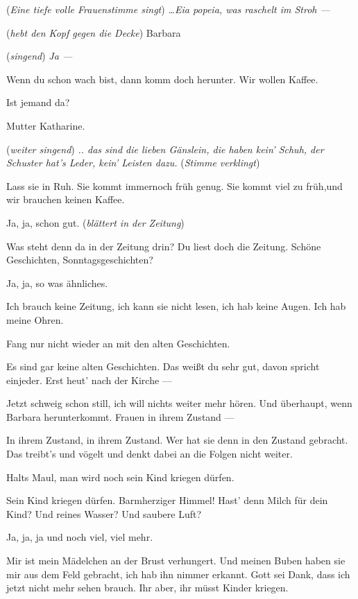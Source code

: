 \documentclass[
	final,
	a4paper,
	ngerman,
	mpinclude = true, %
	twoside = true,
	open = right,
	cleardoublepage = plain,
	DIV = 13,
	BCOR = 1cm,
	titlepage = firstiscover,
	]{scrbook}
\newcommand{\direction}[1]{(\textit{#1})}
\newcommand{\thecharacter}[1]{\textup{\textsc{#1}}\xspace}
\newcommand{\theBarbara}{\thecharacter{Barbara}}
\newcommand{\theJosef}{\thecharacter{Josef}}
\newcommand{\theKathrine}{\thecharacter{Kathrine}}
\newcommand{\character}[1]{\item[#1]}
\newcommand{\Barbara}{\character{\theBarbara}}
\newcommand{\Josef}{\character{\theJosef}}
\newcommand{\Kathrine}{\character{\theKathrine}}
\begin{document}
\begin{play}

\Barbara
\direction{Eine tiefe volle Frauenstimme singt} \emph{\ldots Eia popeia, was raschelt im Stroh ---}

\Josef
\direction{hebt den Kopf gegen die Decke} Barbara

\Barbara
\direction{singend} \emph{Ja ---}

\Josef
Wenn du schon wach bist, dann komm doch herunter. Wir wollen Kaffee.

\Barbara
Ist jemand da?

\Josef
Mutter Katharine.

\Barbara
\direction{weiter singend} \emph{.. das sind die lieben Gänslein, die haben kein' Schuh, der Schuster hat's Leder, kein' Leisten dazu.} \direction{Stimme verklingt}

\Kathrine
Lass sie in Ruh. Sie kommt immernoch früh genug. Sie kommt viel zu früh,und wir brauchen keinen Kaffee.

\Josef
Ja, ja, schon gut. \direction{blättert in der Zeitung}

\Kathrine
Was steht denn da in der Zeitung drin? Du liest doch die Zeitung. Schöne Geschichten, Sonntagsgeschichten?

\Josef
Ja, ja, so was ähnliches.

\Kathrine
Ich brauch keine Zeitung, ich kann sie nicht lesen, ich hab keine Augen. Ich hab meine Ohren.

\Josef
Fang nur nicht wieder an mit den alten Geschichten.

\Kathrine
Es sind gar keine alten Geschichten. Das weißt du sehr gut, davon spricht einjeder. Erst heut' nach der Kirche ---

\Josef
Jetzt schweig schon still, ich will nichts weiter mehr hören. Und überhaupt, wenn Barbara herunterkommt. Frauen in ihrem Zustand ---

\Kathrine
In ihrem Zustand, in ihrem Zustand. Wer hat sie denn in den Zustand gebracht. Das treibt's und vögelt und denkt dabei an die Folgen nicht weiter.

\Josef
Halts Maul, man wird noch sein Kind kriegen dürfen.

\Kathrine
Sein Kind kriegen dürfen. Barmherziger Himmel! Hast' denn Milch für dein Kind? Und reines Wasser? Und saubere Luft?

\Josef
Ja, ja, ja und noch viel, viel mehr.

\Kathrine
Mir ist mein Mädelchen an der Brust verhungert. Und meinen Buben haben sie mir aus dem Feld gebracht, ich hab ihn nimmer erkannt. Gott sei Dank, dass ich jetzt nicht mehr sehen brauch. Ihr aber, ihr müsst Kinder kriegen.


\end{play}
\end{document}

